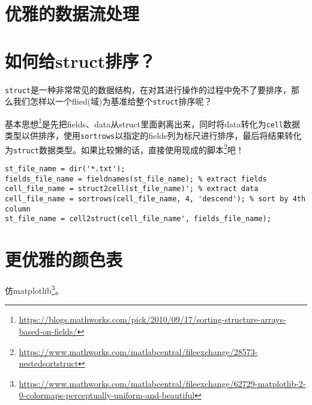 \section{优雅的数据流处理}

\section{如何给struct排序？}

\texttt{struct}是一种非常常见的数据结构，在对其进行操作的过程中免不了要排序，那么我们怎样以一个flied(域)为基准给整个\texttt{struct}排序呢？

基本思想\footnote{\url{https://blogs.mathworks.com/pick/2010/09/17/sorting-structure-arrays-based-on-fields/}}是先把fields、data从struct里面剥离出来，同时将data转化为\texttt{cell}数据类型以供排序，使用\texttt{sortrows}以指定的fields列为标尺进行排序，最后将结果转化为\texttt{struct}数据类型。如果比较懒的话，直接使用现成的脚本\footnote{\url{https://www.mathworks.com/matlabcentral/fileexchange/28573-nestedsortstruct}}吧！

\begin{verbatim}
st_file_name = dir('*.txt');
fields_file_name = fieldnames(st_file_name); % extract fields
cell_file_name = struct2cell(st_file_name)'; % extract data
cell_file_name = sortrows(cell_file_name, 4, 'descend'); % sort by 4th column
st_file_name = cell2struct(cell_file_name', fields_file_name);
\end{verbatim}

\section{更优雅的颜色表}

仿matplotlib\footnote{\url{https://www.mathworks.com/matlabcentral/fileexchange/62729-matplotlib-2-0-colormaps-perceptually-uniform-and-beautiful}}。


